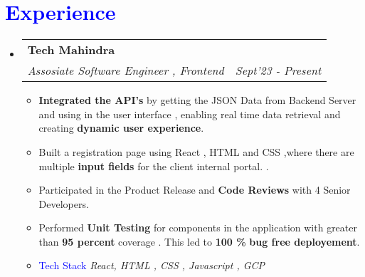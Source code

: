 \documentclass[letterpaper,11pt]{article}
\makeatletter
\newcommand{\resumeItem}[1]{
  \item\small{
    {#1 \vspace{-2pt}}
  }
}
\newcommand{\resumeSubheading}[4]{
  \vspace{-2pt}\item
    \begin{tabular*}{1.0\textwidth}[t]{l@{\extracolsep{\fill}}r}
      \textbf{#1} & \textbf{\small #2} \\
      \textit{\small#3} & \textit{\small #4} \\
    \end{tabular*}\vspace{-7pt}
}
\newcommand{\resumeSubHeadingListStart}{\begin{itemize}[leftmargin=0.0in, label={}]}
\newcommand{\resumeSubHeadingListEnd}{\end{itemize}}
\newcommand{\resumeItemListStart}{\begin{itemize}}
\newcommand{\resumeItemListEnd}{\end{itemize}\vspace{-5pt}}
\makeatother
\begin{document}
\section{\Large \textcolor{blue}{Experience}}
  \resumeSubHeadingListStart
  \vspace{2pt}
        

    \resumeSubheading
      {Tech Mahindra}{}
      { Assosiate Software Engineer , Frontend}{Sept'23 - Present}
         \resumeItemListStart 
         \vspace{2pt}
            \resumeItem{\textbf{Integrated the API's} by getting the JSON Data from Backend Server and using in the user interface , enabling real time data retrieval and creating \textbf{dynamic user experience}.}
             \resumeItem{Built a registration page using React , HTML and CSS ,where there are multiple \textbf{input fields} for the client internal portal.
             .}
              \resumeItem{Participated in the Product Release and \textbf{Code Reviews} with 4 Senior Developers.}
               \resumeItem{Performed \textbf{Unit Testing} for components in the application with greater than \textbf{95 percent }coverage . This led to \textbf{100 \%} \textbf{bug free deployement}.}
               \vspace{4pt}
            \resumeItem{\textcolor{blue}{Tech Stack} \emph{React, HTML , CSS , Javascript , GCP}}
          \resumeItemListEnd 
           
                 \vspace{+6pt}
           
         
     

        
        \resumeSubHeadingListEnd
\end{document}
